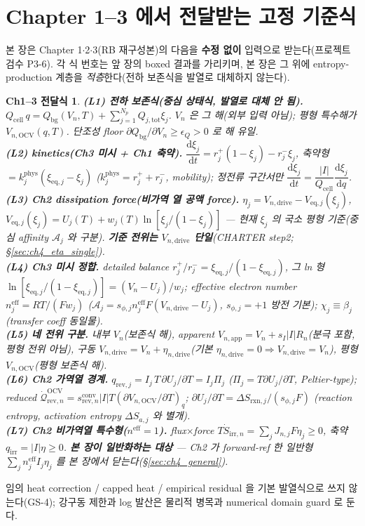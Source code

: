 \documentclass[11pt,a4paper]{article}
\newtheorem*{linkbox}{Ch1--3 전달식}
\newcommand{\dd}{\mathrm{d}}
\newcommand{\eff}{\mathrm{eff}}
\newcommand{\eq}{\mathrm{eq}}
\newcommand{\app}{\mathrm{app}}
\newcommand{\drive}{\mathrm{drive}}
\newcommand{\bg}{\mathrm{bg}}
\newcommand{\cell}{\mathrm{cell}}
\newcommand{\OCV}{\mathrm{OCV}}
\newcommand{\tot}{\mathrm{tot}}
\newcommand{\irr}{\mathrm{irr}}
\newcommand{\rev}{\mathrm{rev}}
\newcommand{\rxn}{\mathrm{rxn}}
\newcommand{\conv}{\mathrm{conv}}
\begin{document}
\section{Chapter 1--3 에서 전달받는 고정 기준식}\label{sec:ch4_inherit}
본 장은 Chapter 1$\cdot$2$\cdot$3(RB 재구성본)의 다음을 \textbf{수정 없이} 입력으로 받는다(프로젝트 검수 P3-6).
각 식 번호는 앞 장의 boxed 결과를 가리키며, 본 장은 그 위에 entropy-production 계층을 \emph{적층}한다(전하
보존식을 발열로 대체하지 않는다).
\begin{linkbox}
\textbf{(L1) 전하 보존식(중심 상태식, 발열로 대체 안 됨).} $Q_\cell\,q=Q_\bg(V_n,T)+\sum_{j=1}^{N_p}Q_{j,\tot}\xi_j$.
$V_n$ 은 그 해(외부 입력 아님); 평형 특수해가 $V_{n,\OCV}(q,T)$. 단조성 floor $\partial Q_\bg/\partial V_n\ge\epsilon_Q>0$
로 해 유일.\\
\textbf{(L2) kinetics(Ch3 미시 + Ch1 축약).} $\dfrac{\dd\xi_j}{\dd t}=r_j^+(1-\xi_j)-r_j^-\xi_j$, 축약형
$=k_j^{\mathrm{phys}}(\xi_{\eq,j}-\xi_j)$ ($k_j^{\mathrm{phys}}=r_j^++r_j^-$, mobility); 정전류 구간서만
$\dfrac{\dd\xi_j}{\dd t}=\dfrac{|I|}{Q_\cell}\dfrac{\dd\xi_j}{\dd q}$.\\
\textbf{(L3) Ch2 dissipation force(비가역 열 공액 force).} $\eta_j=V_{n,\drive}-V_{\eq,j}(\xi_j)$,
$V_{\eq,j}(\xi_j)=U_j(T)+w_j(T)\ln[\xi_j/(1-\xi_j)]$ — 현재 $\xi_j$ 의 \emph{국소 평형} 기준(중심 affinity
$\mathcal A_j$ 와 구분). \textbf{기준 전위는 $V_{n,\drive}$ 단일}(CHARTER step2; \S\ref{sec:ch4_eta_single}).\\
\textbf{(L4) Ch3 미시 정합.} detailed balance $r_j^+/r_j^-=\xi_{\eq,j}/(1-\xi_{\eq,j})$, 그 ln 형
$\ln[\xi_{\eq,j}/(1-\xi_{\eq,j})]=(V_n-U_j)/w_j$; effective electron number $n_j^{\eff}=RT/(Fw_j)$ ($\mathcal A_j
=s_{\phi,j}n_j^{\eff}F(V_{n,\drive}-U_j)$, $s_{\phi,j}=+1$ 방전 기본); $\chi_j\equiv\beta_j$ (transfer coeff
동일물).\\
\textbf{(L5) 네 전위 구분.} 내부 $V_n$(보존식 해), apparent $V_{n,\app}=V_n+s_I|I|R_n$(분극 포함, 평형 전위
아님), 구동 $V_{n,\drive}=V_n+\eta_{n,\drive}$(기본 $\eta_{n,\drive}=0\Rightarrow V_{n,\drive}=V_n$), 평형
$V_{n,\OCV}$(평형 보존식 해).\\
\textbf{(L6) Ch2 가역열 경계.} $q_{\rev,j}=I_j\,T\,\partial U_j/\partial T=I_j\Pi_j$ ($\Pi_j=T\partial U_j/\partial T$,
Peltier-type); reduced $\dot{\mathcal Q}_{\rev,n}^{\OCV}=s_{\rev,n}^{\conv}|I|T(\partial V_{n,\OCV}/\partial T)_q$;
$\partial U_j/\partial T=\Delta S_{\rxn,j}/(s_{\phi,j}F)$ (reaction entropy, activation entropy $\Delta S_{a,j}$
와 별개).\\
\textbf{(L7) Ch2 비가역열 특수형($n^{\eff}=1$).} flux$\times$force $T\dot S_{\irr,n}=\sum_j J_{n,j}F\eta_j\ge0$,
축약 $q_\irr=|I|\eta\ge0$. \textbf{본 장이 일반화하는 대상} — Ch2 가 forward-ref 한 일반형 $\sum_j n_j^{\eff}I_j\eta_j$
를 본 장에서 닫는다(\S\ref{sec:ch4_general}).
\end{linkbox}
임의 heat correction / capped heat / empirical residual 을 기본 발열식으로 쓰지 않는다(GS-4); 강구동 제한과
log 발산은 물리적 병목과 numerical domain guard 로 둔다.
\end{document}
